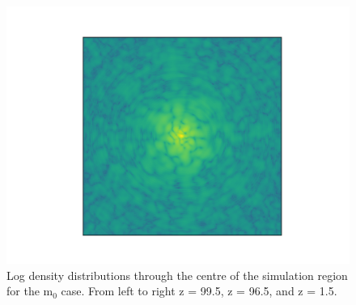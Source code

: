 \documentclass[a4paper,11pt]{article}
\begin{document}
\begin{figure}[!htb]
  \includegraphics[trim={3cm 0 0 0},scale=0.5]{single_light_plane_107.png}
\endminipage
\caption{Log density distributions through the centre of the simulation region for the $\mathrm{m}_0$ case. From left to right z = 99.5, z = 96.5, and z = 1.5.}\label{fig:contours_light}
\end{figure}
\end{document}
